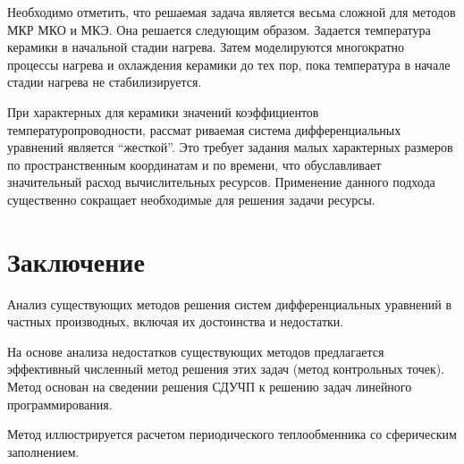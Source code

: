\documentclass[a4paper,12pt]{article}
\begin{document}
Необходимо отметить, что решаемая задача является весьма сложной для
методов МКР МКО и МКЭ. Она решается следующим образом. Задается
температура керамики в начальной стадии нагрева. Затем моделируются
многократно процессы нагрева и охлаждения керамики до тех пор, пока
температура в начале стадии нагрева не стабилизируется. 

При характерных для керамики значений коэффициентов
температуропроводности, рассмат риваемая система дифференциальных
уравнений является “жесткой”. Это требует задания малых характерных
размеров по пространственным координатам и по времени, что
обуславливает значительный расход вычислительных ресурсов. Применение
данного подхода существенно сокращает необходимые для решения задачи
ресурсы. 

\section{Заключение}

Анализ существующих методов решения систем дифференциальных уравнений
в частных производных, включая их достоинства и недостатки.

На основе анализа недостатков существующих методов предлагается
эффективный численный метод решения этих задач (метод контрольных
точек). Метод основан на сведении решения СДУЧП к решению задач
линейного программирования.

Метод иллюстрируется расчетом периодического теплообменника со
сферическим заполнением.
\end{document}
